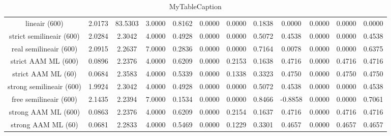 \begin{table}
\centering
\begin{tabular}{|c|c|c|c|c|c|c|c|c|c|c|c|}
\hline
 &  &  &  &  &  &  &  &  &  &  &  \\
\hline
lineair (600) & 2.0173 & 83.5303 & 3.0000 & 0.8162 & 0.0000 & 0.0000 & 0.1838 & 0.0000 & 0.0000 & 0.0000 & 0.0000 \\
\hline
strict semilineair (600) & 2.0284 & 2.3042 & 4.0000 & 0.4928 & 0.0000 & 0.0000 & 0.5072 & 0.4538 & 0.0000 & 0.0000 & 0.4538 \\
\hline
real semilineair (600) & 2.0915 & 2.2637 & 7.0000 & 0.2836 & 0.0000 & 0.0000 & 0.7164 & 0.0078 & 0.0000 & 0.0000 & 0.6375 \\
\hline
strict AAM ML (600) & 0.0896 & 2.2376 & 4.0000 & 0.6209 & 0.0000 & 0.2153 & 0.1638 & 0.4716 & 0.0000 & 0.4716 & 0.4716 \\
\hline
strict AAM ML (60) & 0.0684 & 2.3583 & 4.0000 & 0.5339 & 0.0000 & 0.1338 & 0.3323 & 0.4750 & 0.0000 & 0.4750 & 0.4750 \\
\hline
strong semilineair (600) & 1.9924 & 2.3042 & 4.0000 & 0.4928 & 0.0000 & 0.0000 & 0.5072 & 0.4538 & 0.0000 & 0.0000 & 0.4538 \\
\hline
free semilineair (600) & 2.1435 & 2.2394 & 7.0000 & 0.1534 & 0.0000 & 0.0000 & 0.8466 & -0.8858 & 0.0000 & 0.0000 & 0.7061 \\
\hline
strong AAM ML (600) & 0.0863 & 2.2376 & 4.0000 & 0.6209 & 0.0000 & 0.2154 & 0.1637 & 0.4716 & 0.0000 & 0.4716 & 0.4716 \\
\hline
strong AAM ML (60) & 0.0681 & 2.2833 & 4.0000 & 0.5469 & 0.0000 & 0.1229 & 0.3301 & 0.4657 & 0.0000 & 0.4657 & 0.4657 \\
\hline
\end{tabular}
\caption{MyTableCaption}
\label{table:MyTableLabel}
\end{table}
